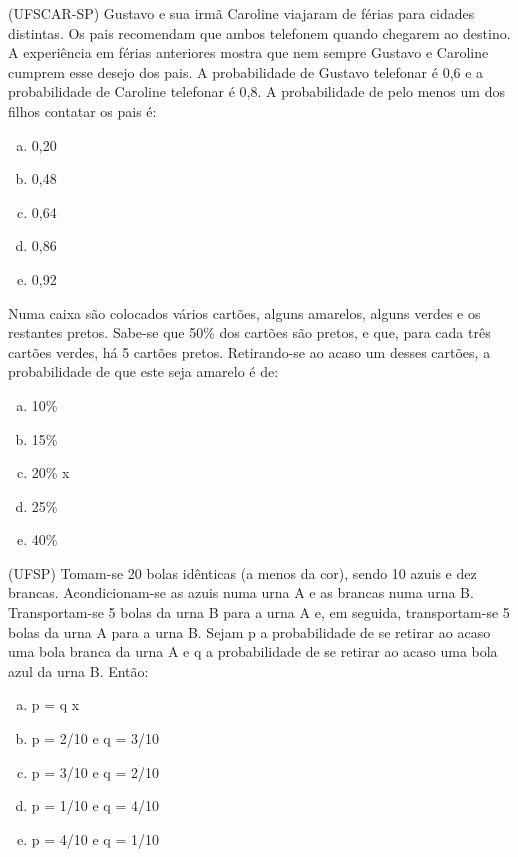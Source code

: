 \item (UFSCAR-SP) Gustavo e sua irmã Caroline viajaram de férias para cidades distintas. Os pais recomendam que ambos telefonem quando chegarem ao destino. A experiência em férias anteriores mostra que nem sempre Gustavo e Caroline cumprem esse desejo dos pais. A probabilidade de Gustavo telefonar é 0,6 e a probabilidade de Caroline telefonar é 0,8. A probabilidade de pelo menos um dos filhos contatar os pais é:
\begin{multicols}{5}
\begin{enumerate}[a)]
	\item 0,20
	\item 0,48
	\item 0,64
	\item 0,86
	\item 0,92
\end{enumerate}
\end{multicols}

\item Numa caixa são colocados vários cartões, alguns amarelos, alguns verdes e os restantes pretos. Sabe-se que 50\% dos cartões são pretos, e que, para cada três cartões verdes, há 5 cartões pretos. Retirando-se ao acaso um desses cartões, a probabilidade de que este seja amarelo é de:
\begin{multicols}{5}
\begin{enumerate}[a)]
	\item 10\%
	\item 15\%
	\item 20\% x
	\item 25\%
	\item 40\%
\end{enumerate}
\end{multicols}

\item (UFSP) Tomam-se 20 bolas idênticas (a menos da cor), sendo 10 azuis e dez brancas. Acondicionam-se as azuis numa urna A e as brancas numa urna B. Transportam-se 5 bolas da urna B para a urna A e, em seguida, transportam-se 5 bolas da urna A para a urna B. Sejam p a probabilidade de se retirar ao acaso uma bola branca da urna A e q a probabilidade de se retirar ao acaso uma bola azul da urna B. Então:
\begin{multicols}{5}
\begin{enumerate}[a)]
	\item p = q  x
	\item p = 2/10  e  q = 3/10
	\item p = 3/10  e  q = 2/10
	\item p = 1/10  e  q = 4/10
	\item p = 4/10  e  q = 1/10
\end{enumerate}
\end{multicols}

